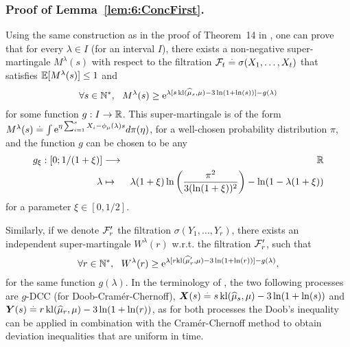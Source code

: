 \subsubsection{Proof of Lemma~\ref{lem:6:ConcFirst}.}
\label{app:6:proofConcFirst}
%
Using the same construction as in the proof of Theorem~14 in \cite{KK18Martingales}, one can prove that for every $\lambda \in I$ (for an interval $I$), there exists a non-negative super-martingale $M^\lambda (s)$ with respect to the filtration $\mathcal{F}_t \overset{.}{=} \sigma(X_1,\dots,X_t)$ that satisfies $\mathbb{E}[M^\lambda(s)] \leq 1$ and
\[\forall s \in \mathbb{N}^*, \ \ M^\lambda (s) \geq \mathrm{e}^{\lambda [s \, \mathrm{kl}(\widehat{\mu}_s,\mu) - 3\ln(1+\ln(s))] - g(\lambda)}\]
for some function $g : I \rightarrow \mathbb{R}$. This super-martingale is of the form
$M^\lambda (s) \overset{.}{=} \int \mathrm{e}^{\eta\sum_{i=1}^s X_i - \phi_\mu(\lambda)s} d\pi(\eta)$,
for a well-chosen probability distribution $\pi$, and the function $g$ can be chosen to be any
\begin{eqnarray*}
    g_{\xi} : \left[0; 1/(1+\xi)\right] & \longrightarrow & \mathbb{R} \\
    \lambda & \mapsto & \lambda(1+\xi) \ln \left(\frac{\pi^2}{3(\ln(1+\xi))^2}\right) -  \ln(1 - \lambda(1 + \xi))
\end{eqnarray*}
for a parameter $\xi \in [0,1/2]$.

Similarly, if we denote $\mathcal{F}_r'$ the filtration $\sigma(Y_1,\dots,Y_r)$,
there exists an independent super-martingale $W^\lambda (r)$ w.r.t. the filtration $\mathcal{F}_r'$, such that
\[\forall r \in \mathbb{N}^*, \ \ W^\lambda (r) \geq \mathrm{e}^{\lambda [r\mathrm{kl}(\widehat{\mu}'_r,\mu) - 3\ln(1+\ln(r))] - g(\lambda)},\]
for the same function $g(\lambda)$.
In the terminology of \cite{KK18Martingales},
the two following processes are $g$-DCC (for Doob-Cram\'er-Chernoff),
$\bm{X}(s) \overset{.}{=} s \, \mathrm{kl}(\widehat{\mu}_s,\mu) - 3\ln(1+\ln(s))$ and $\bm{Y}(s) \overset{.}{=} r \, \mathrm{kl}(\widehat{\mu}_r,\mu) - 3\ln(1+\ln(r))$,
as for both processes the Doob's inequality can be applied in combination with the Cram\'er-Chernoff method to obtain deviation inequalities that are uniform in time.

